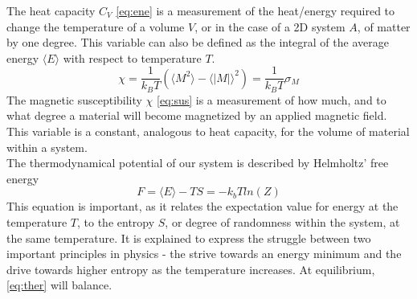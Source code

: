 \documentclass[10pt, nofootinbib, twocolumn]{revtex4-1}
\begin{document}
The heat capacity $C_V$ \eqref{eq:ene} is a measurement of the heat/energy required to change the temperature of a volume $V$, or in the case of a 2D system $A$, of matter by one degree. This variable can also be defined as the integral of the average energy $\langle E \rangle$ with respect to temperature $T$. 
\begin{equation}
    \chi = \frac{1}{k_B T}(\langle M^2 \rangle - \langle |M| \rangle^2) = \frac{1}{k_B T} \sigma_M \label{eq:sus}
\end{equation}
The magnetic susceptibility $\chi$ \eqref{eq:sus} is a measurement of how much, and to what degree a material will become magnetized by an applied magnetic field. This variable is a constant, analogous to heat capacity, for the volume of material within a system. \\The thermodynamical potential of our system is described by Helmholtz' free energy \cite[p.~430]{notes}
\begin{equation}
    F = \langle E \rangle - TS = -k_bTln(Z) \label{eq:ther}
\end{equation}
This equation is important, as it relates the expectation value for energy at the temperature $T$, to the entropy $S$, or degree of randomness within the system, at the same temperature. It is explained to express the struggle between two important principles in physics \cite[p.~419]{notes} - the strive towards an energy minimum and the drive towards higher entropy as the temperature increases. At equilibrium, \eqref{eq:ther} will balance. 

\newpage
\end{document}
